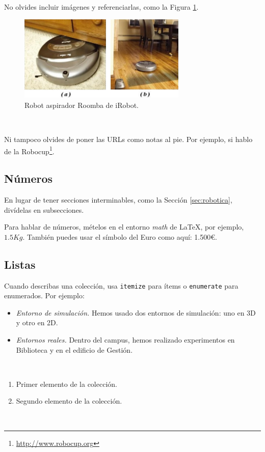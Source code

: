 No olvides incluir imágenes y referenciarlas, como la Figura \ref{fig:roomba}.

\begin{figure} [h!]
  \begin{center}
    \includegraphics[width=8cm]{figs/roomba}
  \end{center}
  \caption{Robot aspirador Roomba de iRobot.}
  \label{fig:roomba}
\end{figure}\

Ni tampoco olvides de poner las URLs como notas al pie. Por ejemplo, si hablo de la Robocup\footnote{\url{http://www.robocup.org}}.

\subsection{Números}
\label{sec:subseccion}

En lugar de tener secciones interminables, como la Sección \ref{sec:robotica}, divídelas en subsecciones.

Para hablar de números, mételos en el entorno \textit{math} de \LaTeX, por ejemplo, $1.5Kg$. También puedes usar el símbolo del Euro como aquí: 1.500\euro.

\subsection{Listas}

Cuando describas una colección, usa \texttt{itemize} para ítems o \texttt{enumerate} para enumerados. Por ejemplo:

\begin{itemize}
 \item \textit{Entorno de simulación.} Hemos usado dos entornos de simulación: uno en 3D y otro en 2D.
 \item \textit{Entornos reales.} Dentro del campus, hemos realizado experimentos en Biblioteca y en el edificio de Gestión.
\end{itemize}\

\begin{enumerate}
 \item Primer elemento de la colección.
 \item Segundo elemento de la colección.
\end{enumerate}\

